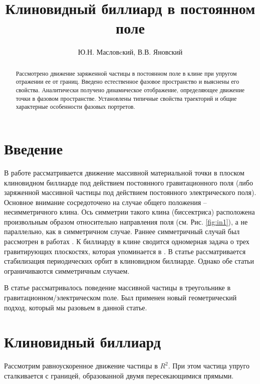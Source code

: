 \documentclass[a4paper]{article}
\title{Клиновидный биллиард в постоянном поле}
\author{Ю.Н. Масловcкий, В.В. Яновский}
\begin{document}
\maketitle

\begin{abstract}
Рассмотрено движение заряженной частицы в постоянном поле в клине при упругом отражении ее от границ. Введено естественное фазовое пространство и выяснены его свойства. Аналитически получено динамическое отображение, определяющее движение точки в фазовом пространстве. Установлены типичные свойства траекторий и общие характерные особенности фазовых портретов.
\end{abstract}

\section{Введение}

В работе рассматривается движение массивной материальной точки в плоском клиновидном биллиарде под действием постоянного гравитационного поля (либо заряженной массивной частицы под действием постоянного электрического поля). Основное внимание сосредоточено на случае общего положения -- несимметричного клина. Ось симметрии такого клина (биссектриса) расположена произвольным образом относительно направления поля (см. Рис. \ref{fig:in1}), а не параллельно, как в симметричном случае.  Раннее симметричный случай был рассмотрен в работах \cite{Lehtihet1986,Sepulchre2003}.  К биллиарду в клине сводится одномерная задача о трех гравитирующих  плоскостях, которая упоминается в \cite{Lehtihet1986}. В статье \cite{Sepulchre2003} рассматривается стабилизация периодических орбит в клиновидном биллиарде.  Однако обе статьи ограничиваются симметричным случаем.

В статье \cite{Yanovskii2013}  рассматривалось поведение массивной частицы в треугольнике в гравитационном/электрическом поле. Был применен новый геометрический подход, который мы разовьем в данной статье.


\section{ Клиновидный биллиард }\label{klin_billiard}

Рассмотрим равноускоренное движение частицы в $R^{2} $. При этом частица упруго сталкивается с границей, образованной двумя пересекающимися прямыми.
\end{document}
